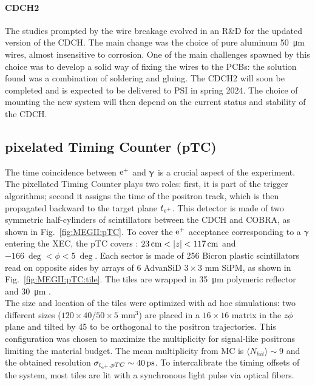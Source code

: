 \begin{refsection}
        \paragraph{CDCH2} The studies prompted by the wire breakage evolved in an R\&D for the updated version of the CDCH. The main change was the choice of pure aluminum \SI{50}{\micro m} wires,  almost insensitive to corrosion.
        One of the main challenges spawned by this choice was to develop a solid way of fixing the wires to the PCBs: the solution found was a combination of soldering and gluing.
        The CDCH2 will soon be completed and is expected to be delivered to PSI in spring 2024.
        The choice of mounting the new system will then depend on the current status and stability of the CDCH.

    \subsection{pixelated Timing Counter (pTC)}
        The time coincidence between $\text{e}^+$ and $\upgamma$ is a crucial aspect of the experiment. 
        The pixellated Timing Counter plays two roles: first, it is part of the trigger algorithms; second it assigns the time of the positron track, which is then propagated backward to the target plane $t_{\text{e}^+}$. 
        This detector is made of two symmetric half-cylinders of scintillators between the CDCH and COBRA, as shown in Fig.~\ref{fig:MEGII:pTC}.
        To cover the $\text{e}^+$ acceptance corresponding to a $\upgamma$ entering the XEC, the pTC covers : $\SI{23}{cm}<\abs{z}<\SI{117}{cm}$ and $\SI{-166}{\deg}<\phi<\SI{5}{\deg}$. 
        Each sector is made of 256 Bicron  plastic scintillators read on opposite sides by arrays of 6 AdvanSiD $3\times3$ mm SiPM, as shown in Fig.~\ref{fig:MEGII:pTC:tile}.
        The tiles are wrapped in \SI{35}{\micro m} polymeric reflector and \SI{30}{\micro m} \tedlar.\\
        The size and location of the tiles were optimized with ad hoc simulations: two different sizes ($120\times40/50\times5$ mm$^3$)  are placed in a $16\times16$ matrix in the $z\phi$ plane and tilted by \SI{45}{\deg} to be orthogonal to the positron trajectories.
        This configuration was chosen to maximize the multiplicity for signal-like positrons limiting the material budget.
        The mean multiplicity from MC is $\langle N_{hit} \rangle\sim 9$ and the obtained resolution $\sigma_{t_{\Ae}, pTC} \sim \SI{40}{\pico s}$.
        To intercalibrate the timing offsets of the system, most tiles are lit with a synchronous light pulse via optical fibers.
        

\end{refsection}
